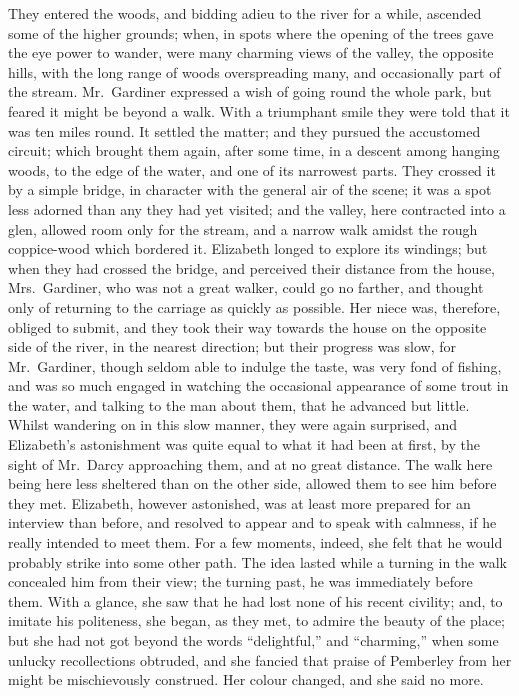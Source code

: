 They entered the woods, and bidding adieu to the river for a
while, ascended some of the higher grounds; when, in spots where
the opening of the trees gave the eye power to wander, were many
charming views of the valley, the opposite hills, with the long
range of woods overspreading many, and occasionally part of the
stream.  Mr.\ Gardiner expressed a wish of going round the whole
park, but feared it might be beyond a walk.  With a triumphant
smile they were told that it was ten miles round.  It settled the
matter; and they pursued the accustomed circuit; which brought
them again, after some time, in a descent among hanging woods,
to the edge of the water, and one of its narrowest parts.  They
crossed it by a simple bridge, in character with the general air
of the scene; it was a spot less adorned than any they had yet
visited; and the valley, here contracted into a glen, allowed
room only for the stream, and a narrow walk amidst the rough
coppice-wood which bordered it.  Elizabeth longed to explore its
windings; but when they had crossed the bridge, and perceived
their distance from the house, Mrs.\ Gardiner, who was not a
great walker, could go no farther, and thought only of returning
to the carriage as quickly as possible.  Her niece was, therefore,
obliged to submit, and they took their way towards the house on
the opposite side of the river, in the nearest direction; but
their progress was slow, for Mr.\ Gardiner, though seldom able to
indulge the taste, was very fond of fishing, and was so much
engaged in watching the occasional appearance of some trout in
the water, and talking to the man about them, that he advanced
but little.  Whilst wandering on in this slow manner, they were
again surprised, and Elizabeth's astonishment was quite equal to
what it had been at first, by the sight of Mr.\ Darcy approaching
them, and at no great distance.  The walk here being here less
sheltered than on the other side, allowed them to see him before
they met.  Elizabeth, however astonished, was at least more
prepared for an interview than before, and resolved to appear
and to speak with calmness, if he really intended to meet them.
For a few moments, indeed, she felt that he would probably strike
into some other path.  The idea lasted while a turning in the
walk concealed him from their view; the turning past, he was
immediately before them.  With a glance, she saw that he had lost
none of his recent civility; and, to imitate his politeness, she
began, as they met, to admire the beauty of the place; but she
had not got beyond the words ``delightful,'' and ``charming,'' when
some unlucky recollections obtruded, and she fancied that praise
of Pemberley from her might be mischievously construed.  Her
colour changed, and she said no more.

